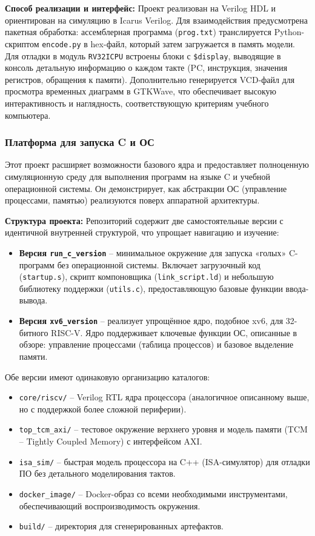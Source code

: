 \textbf{Способ реализации и интерфейс:}
Проект реализован на Verilog HDL и ориентирован на симуляцию в Icarus Verilog. Для взаимодействия предусмотрена пакетная обработка: ассемблерная программа (\texttt{prog.txt}) транслируется Python-скриптом \texttt{encode.py} в hex-файл, который затем загружается в память модели. Для отладки в модуль \texttt{RV32ICPU} встроены блоки с \texttt{\$display}, выводящие в консоль детальную информацию о каждом такте (PC, инструкция, значения регистров, обращения к памяти). Дополнительно генерируется VCD-файл для просмотра временных диаграмм в GTKWave, что обеспечивает высокую интерактивность и наглядность, соответствующую критериям учебного компьютера.

\subsubsection{Платформа для запуска C и ОС}
Этот проект расширяет возможности базового ядра и предоставляет полноценную симуляционную среду для выполнения программ на языке C и учебной операционной системы. Он демонстрирует, как абстракции ОС (управление процессами, памятью) реализуются поверх аппаратной архитектуры.

\textbf{Структура проекта:}
Репозиторий содержит две самостоятельные версии с идентичной внутренней структурой, что упрощает навигацию и изучение:
\begin{itemize}
    \item \textbf{Версия \texttt{run\_c\_version}} – минимальное окружение для запуска «голых» C-программ без операционной системы. Включает загрузочный код (\texttt{startup.s}), скрипт компоновщика (\texttt{link\_script.ld}) и небольшую библиотеку поддержки (\texttt{utils.c}), предоставляющую базовые функции ввода-вывода.
    \item \textbf{Версия \texttt{xv6\_version}} – реализует упрощённое ядро, подобное xv6, для 32-битного RISC-V. Ядро поддерживает ключевые функции ОС, описанные в обзоре: управление процессами (таблица процессов) и базовое выделение памяти.
\end{itemize}

Обе версии имеют одинаковую организацию каталогов:
\begin{itemize}
    \item \texttt{core/riscv/} – Verilog RTL ядра процессора (аналогичное описанному выше, но с поддержкой более сложной периферии).
    \item \texttt{top\_tcm\_axi/} – тестовое окружение верхнего уровня и модель памяти (TCM – Tightly Coupled Memory) с интерфейсом AXI.
    \item \texttt{isa\_sim/} – быстрая модель процессора на C++ (ISA-симулятор) для отладки ПО без детального моделирования тактов.
    \item \texttt{docker\_image/} – Docker-образ со всеми необходимыми инструментами, обеспечивающий воспроизводимость окружения.
    \item \texttt{build/} – директория для сгенерированных артефактов.
\end{itemize}

